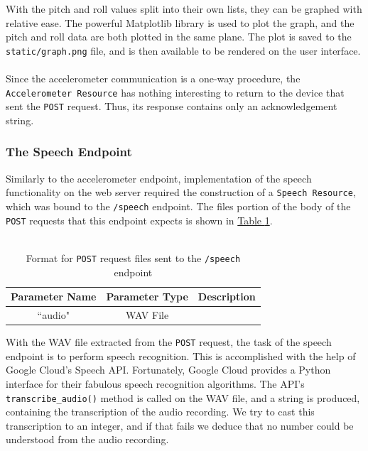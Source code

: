 With the pitch and roll values split into their own lists, they can be graphed with relative ease.
The powerful Matplotlib\cite{matplotlib} library is used to plot the graph, and the pitch and roll
data are both plotted in the same plane. The plot is saved to the \texttt{static/graph.png} file,
and is then available to be rendered on the user interface.\\\\
Since the accelerometer communication is a one-way procedure, the \texttt{Accelerometer Resource}
has nothing interesting to return to the device that sent the \texttt{POST} request. Thus, its
response contains only an acknowledgement string.
\subsubsection{The Speech Endpoint}
Similarly to the accelerometer endpoint, implementation of the speech functionality on the web
server required the construction of a \texttt{Speech Resource}, which was bound to the
\texttt{/speech} endpoint. The files portion of the body of the \texttt{POST} requests that this
endpoint expects is shown in \hyperref[tab:micjson]{Table \ref{tab:micjson}}.\\\\
\begin{table}[h]
	\caption{Format for \texttt{POST} request files sent to the \texttt{/speech}
	endpoint}\label{tab:micjson}
	\begin{center}
		\begin{tabular}{|c|c|c|}
			\hline
			\textbf{Parameter Name} & \textbf{Parameter Type} & \textbf{Description}\\\hline
			``audio" & WAV File & \shortstack[c]{File containing audio recording in WAV format.} \\\hline
		\end{tabular}
	\end{center}
\end{table}
With the WAV file extracted from the \texttt{POST} request, the task of the speech endpoint is to
perform speech recognition. This is accomplished with the help of Google Cloud's Speech API.
Fortunately, Google Cloud provides a Python interface for their fabulous speech recognition
algorithms. The API's \texttt{transcribe\_audio()} method is called on the WAV file, and a string is
produced, containing the transcription of the audio recording. We try to cast this transcription to
an integer, and if that fails we deduce that no number could be understood from the audio recording.
